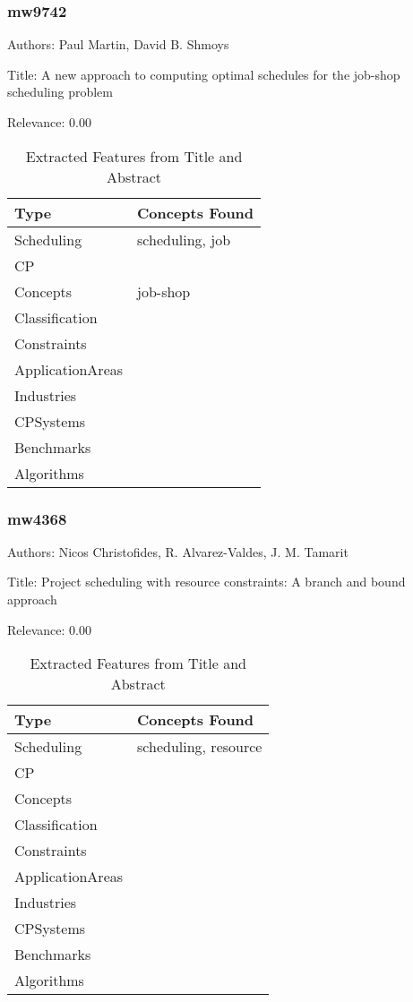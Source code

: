 \subsubsection{mw9742}
\label{mw:mw9742}

Authors: Paul Martin, David B. Shmoys

Title: A new approach to computing optimal schedules for the job-shop scheduling problem

Relevance:  0.00

{\scriptsize
\begin{longtable}{p{2cm}p{20cm}}
\caption{Extracted Features from Title and Abstract}\\ \toprule
Type & Concepts Found\\ \midrule
\endhead
\bottomrule
\endfoot
Scheduling & scheduling, job\\ 
CP & \\ 
Concepts & job-shop\\ 
Classification & \\ 
Constraints & \\ 
ApplicationAreas & \\ 
Industries & \\ 
CPSystems & \\ 
Benchmarks & \\ 
Algorithms & \\ 
\end{longtable}
}



\subsubsection{mw4368}
\label{mw:mw4368}

Authors: Nicos Christofides, R. Alvarez-Valdes, J. M. Tamarit

Title: Project scheduling with resource constraints: A branch and bound approach

Relevance:  0.00

{\scriptsize
\begin{longtable}{p{2cm}p{20cm}}
\caption{Extracted Features from Title and Abstract}\\ \toprule
Type & Concepts Found\\ \midrule
\endhead
\bottomrule
\endfoot
Scheduling & scheduling, resource\\ 
CP & \\ 
Concepts & \\ 
Classification & \\ 
Constraints & \\ 
ApplicationAreas & \\ 
Industries & \\ 
CPSystems & \\ 
Benchmarks & \\ 
Algorithms & \\ 
\end{longtable}
}



